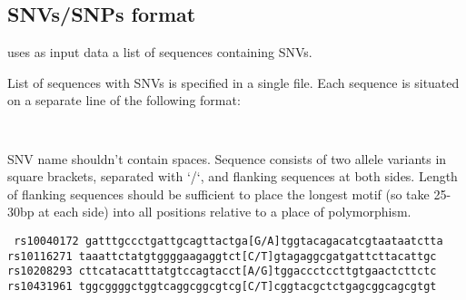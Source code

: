 \subsection{SNVs/SNPs format}
 uses as input data a list of sequences containing SNVs.

List of sequences with SNVs is specified in a single file. Each sequence is situated on a separate line of the following format:

\texttt{ }

SNV name shouldn't contain spaces. Sequence consists of two allele variants in square brackets, separated with `/`, and flanking sequences at both sides. Length of flanking sequences should be sufficient to place the longest motif (so take 25-30bp at each side) into all positions relative to a place of polymorphism. 

\noindent\texttt{%
rs10040172 gatttgccctgattgcagttactga[G/A]tggtacagacatcgtaataatctta
rs10116271 taaattctatgtggggaagaggtct[C/T]gtagaggcgatgattcttacattgc
rs10208293 cttcatacatttatgtccagtacct[A/G]tggaccctccttgtgaactcttctc
rs10431961 tggcggggctggtcaggcggcgtcg[C/T]cggtacgctctgagcggcagcgtgt
}
